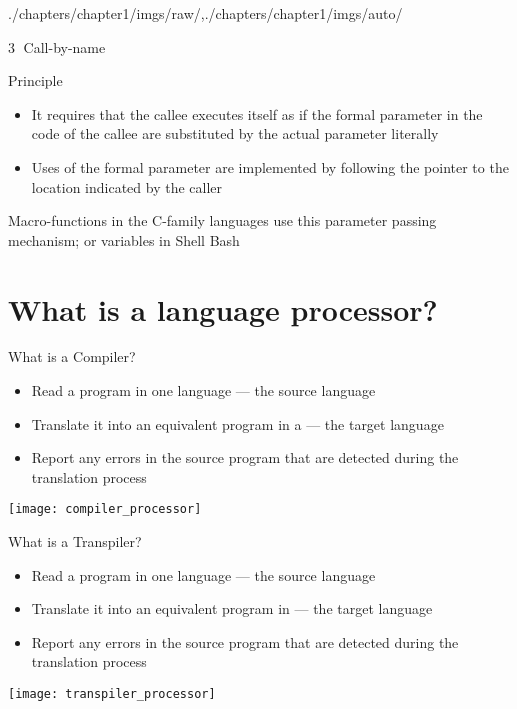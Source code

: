 \begin{graphicspathcontext}{{./chapters/chapter1/imgs/raw/},{./chapters/chapter1/imgs/auto/}}
\begin{bibunit}[apalike]
\begin{frame}{\textcircled{3} Call-by-name}
	\begin{block}{Principle}
		\begin{itemize}
			\item It requires that the callee executes itself as if the formal parameter in the code of the callee are substituted by the actual parameter literally
			\item Uses of the formal parameter are implemented by following the pointer to the location indicated by the caller
		\end{itemize}
	\end{block}
	\vspace{1cm}
	\begin{example}
		Macro-functions in the C-family languages use this parameter passing mechanism; or variables in Shell Bash
	\end{example}
\end{frame}


\section[Language processor]{What is a language processor?}

\sectiontableofcontentslide

\begin{frame}{{What is a} Compiler?}
	\begin{itemize}
	\item Read a program in one language --- the source language
	\item Translate it into an equivalent program in a  --- the target language
	\vfill
	\item Report any errors in the source program that are detected during the translation process
	\end{itemize}
	\vfill
	\begin{center}
		\texttt{[image: compiler\_processor]}
	\end{center}
\end{frame}

\begin{frame}{{What is a} Transpiler?}
	\begin{itemize}
		\item Read a program in one language --- the source language
		\item Translate it into an equivalent program in  --- the target language
		\vfill
		\item Report any errors in the source program that are detected during the translation process
	\end{itemize}
	\vfill
	\begin{center}
		\texttt{[image: transpiler\_processor]}
	\end{center}
\end{frame}


\end{bibunit}
\end{graphicspathcontext}
